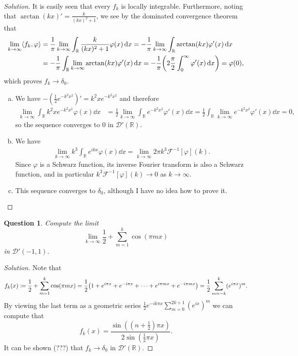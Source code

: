 \documentclass{article}
\theoremstyle{plain}
\newtheorem{question}{Question}
\theoremstyle{remark}
\newenvironment{solution}{\begin{proof}[Solution]\renewcommand\qedsymbol{}}{\end{proof}}
\renewcommand{\phi}{\varphi}
\newcommand{\Bb}{\mathbb}
\newcommand{\Cal}{\mathcal}
\newcommand{\RR}{\Bb R}
\newcommand{\DD}{\Cal D}
\DeclarePairedDelimiter{\ang}{\langle}{\rangle}
\newcommand\ceq\coloneqq %
\begin{document}
\begin{solution}
	It is easily seen that every $f_k$ is locally integrable. Furthermore, noting that $\arctan(kx)' = \frac{k}{(kx)^2 + 1}$, we see by the dominated convergence theorem that
	\begin{align*}
		\lim_{k\to\infty}\ang{f_k, \phi} &= \frac1\pi \lim_{k\to\infty} \int_\RR \frac{k}{(kx)^2 + 1} \phi(x) \dd{x} = -\frac1\pi \lim_{k\to\infty} \int_\RR \arctan(kx) \phi'(x) \dd{x} \\
		&= -\frac1\pi \int_\RR \lim_{k\to\infty} \arctan(kx) \phi'(x) \dd{x} = -\frac1\pi \qty(2 \frac\pi2 \int_0^\infty \phi'(x) \dd{x} ) = \phi(0), 
	\end{align*}
which proves $f_k \to \delta_0$. 

\begin{enumerate}[(a)]
	\item We have $- (\frac12 e^{-k^2x^2})' = k^2 x e^{-k^2 x^2}$ and therefore
	\begin{align*}
		\lim_{k\to\infty} \int_\RR k^2 x e^{-k^2x^2} \phi(x) \dd{x} &= \frac12 \lim_{k\to\infty}  \int_\RR  e^{-k^2 x^2} \phi'(x) \dd{x} = \frac12 \int_\RR \lim_{k\to\infty} e^{-k^2 x^2} \phi'(x) \dd{x} = 0,
	\end{align*}
so the sequence converges to 0 in $\DD'(\RR)$. 

\item We have 
\begin{align*}
	\lim_{k\to\infty}  k^3 \int_\RR e^{ikx} \phi(x) \dd{x} = \lim_{k\to\infty} 2\pi k^3 \Cal F^{-1}[\phi](k). 
\end{align*}
Since $\phi$ is a Schwarz function, its inverse Fourier transform is also a Schwarz function, and in particular $k^3 \Cal F^{-1}[\phi](k) \to 0$ as $k \to \infty$. 

\item This sequence converges to $\delta_0$, although I have no idea how to prove it. 

\end{enumerate}
\end{solution}

\begin{question}
	Compute the limit
	\[
	\lim_{k\to\infty} \frac12 + \sum_{m=1}^k \cos(\pi m x)
	\]
	in $\DD'(-1, 1)$. 
\end{question}

\begin{solution}
	Note that \[
	f_k(x) \ceq 
	\frac12 + \sum_{m=1}^k \cos(\pi m x) = \frac12\qty(1 + e^{i \pi x} + e^{-i\pi x} + \dotsb + e^{i \pi m x} + e^{-i\pi m x}) = \frac12 \sum_{m=-k}^k (e^{i\pi x})^m.
	\]
	By viewing the last term as a geometric series $\frac12 e^{-ik\pi x} \sum_{m=0}^{2k+1} (e^{ix})^m$ we can compute that 
	\[
	f_k(x) = \frac{\sin((n + \frac12) \pi x)}{2\sin(\frac12\pi x)}. 
	\]
	It can be shown (???) that $f_k \to \delta_0$ in $\DD'(\RR)$. 
\end{solution}
\end{document}
